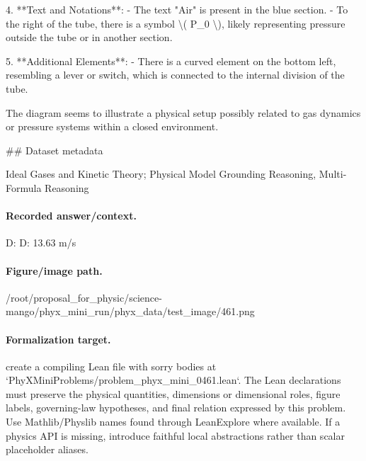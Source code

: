 4. **Text and Notations**:
   - The text "Air" is present in the blue section.
   - To the right of the tube, there is a symbol \textbackslash{}( P\_0 \textbackslash{}), likely representing pressure outside the tube or in another section.

5. **Additional Elements**:
   - There is a curved element on the bottom left, resembling a lever or switch, which is connected to the internal division of the tube.

The diagram seems to illustrate a physical setup possibly related to gas dynamics or pressure systems within a closed environment.

\#\# Dataset metadata

Ideal Gases and Kinetic Theory; Physical Model Grounding Reasoning, Multi-Formula Reasoning

\paragraph{Recorded answer/context.}
D: D: 13.63 m/s

\paragraph{Figure/image path.}
/root/proposal\_for\_physic/science-mango/phyx\_mini\_run/phyx\_data/test\_image/461.png

\paragraph{Formalization target.}
create a compiling Lean file with sorry bodies at `PhyXMiniProblems/problem\_phyx\_mini\_0461.lean`. The Lean declarations must preserve the physical quantities, dimensions or dimensional roles, figure labels, governing-law hypotheses, and final relation expressed by this problem.
Use Mathlib/Physlib names found through LeanExplore where available. If a physics API is missing, introduce faithful local abstractions rather than scalar placeholder aliases.

